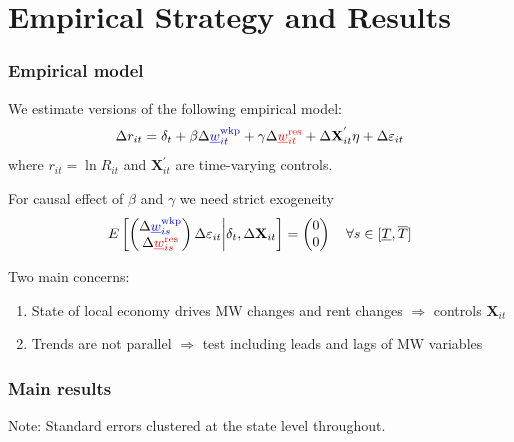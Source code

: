 \documentclass[aspectratio=169, t]{beamer}
\newcommand{\mw}{\underline{w}}
\newcommand{\wkp}{\text{wkp}}
\newcommand{\res}{\text{res}}
\begin{document}
\section{Empirical Strategy and Results}

\begin{frame}
    \frametitle{Empirical model}
        
    We estimate versions of the following empirical model:
    \[
    \Delta r_{it} = \delta_t +
        \beta \Delta {\color{blue}\mw^{\wkp}_{it}} +
        \gamma \Delta {\color{red}\mw^{\res}_{it}} + 
        \Delta \mathbf{X}^{'}_{it} \eta + 
        \Delta \varepsilon_{it} 
    \]
    where $r_{it} = \ln R_{it}$ and $\mathbf{X}^{'}_{it}$ are time-varying controls.
    
    \pause
    \vspace{3mm}
    For causal effect of $\beta$ and $\gamma$ we need strict exogeneity
    $$
    E\left[
        \begin{pmatrix}
            \Delta {\color{blue}\mw^{\wkp}_{is}} \\
            \Delta {\color{red}\mw^{\res}_{is}} \\
        \end{pmatrix}
        \Delta \varepsilon_{it}
    \bigg| \delta_t, \Delta \mathbf{X}_{it} \right] =
    \begin{pmatrix}
        0 \\
        0 \\
    \end{pmatrix}
    \quad \forall s\in[\underline T, \overline T]
    $$

    \pause
    \vspace{2mm}
    Two main concerns:
    \begin{enumerate}
        \item State of local economy drives MW changes and rent changes $\Rightarrow$ controls $\mathbf{X}_{it}$
        \item Trends are not parallel $\Rightarrow$ test including leads and lags of MW variables
    \end{enumerate}

\end{frame}

\begin{frame}[label = static]
    \frametitle{Main results}

    
    
    \vspace{2mm}
    \footnotesize
    Note: Standard errors clustered at the state level throughout.

\end{frame}
\end{document}
